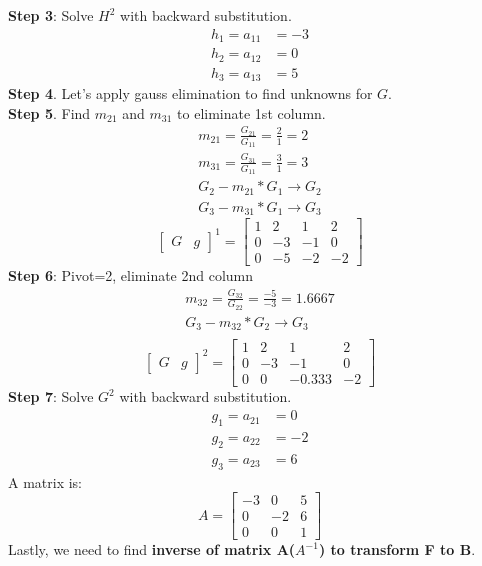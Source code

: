 \documentclass{article}
\begin{document}
\textbf{Step 3}: Solve $H^2$ with backward substitution.
\begin{align}
	h_1=a_{11}&=-3\\h_2=a_{12}&=0\\h_3=a_{13}&=5
\end{align}
\textbf{Step 4}. Let's apply gauss elimination to find unknowns for $G$.\\
\textbf{Step 5}. Find $m_{21}$ and $m_{31}$ to eliminate 1st column.\\
\begin{align}
	m_{21}=\frac{G_{21}}{G_{11}}=\frac{2}{1}=2\\
	m_{31}=\frac{G_{31}}{G_{11}}=\frac{3}{1}=3\\
	G_2-m_{21}*G_1 \rightarrow  G_2\\
	G_3-m_{31}*G_1 \rightarrow  G_3
\end{align}
\[
\left[
\begin{array}{c|c}
G&g
\end{array}
\right]^1
=
\left[
\begin{array}{ccc|c}
	1&2&1&2\\
	0&-3&-1&0\\
	0&-5&-2&-2 
\end{array}
\right]
\]
\textbf{Step 6}: Pivot=2, eliminate 2nd column
\begin{align}
	m_{32}=\frac{G_{32}}{G_{22}}=\frac{-5}{-3}=1.6667\\
	G_3-m_{32}*G_2 \rightarrow  G_3\\
\end{align}
\[
\left[
\begin{array}{c|c}
G&g
\end{array}
\right]^2
=
\left[
\begin{array}{ccc|c}
	1&2&1&2\\
	0&-3&-1&0\\
	0&0&-0.333&-2
\end{array}
\right]
\]
\textbf{Step 7}: Solve $G^2$ with backward substitution.
\begin{align}
	g_1=a_{21}&=0\\g_2=a_{22}&=-2\\g_3=a_{23}&=6
\end{align}
A matrix is:
\[
A
=
\begin{bmatrix}
	-3&0&5\\
	0&-2&6\\
	0&0&1
\end{bmatrix}
\]
Lastly, we need to find \textbf{inverse of matrix A($A^{-1}$) to transform F to B}.
\end{document}
